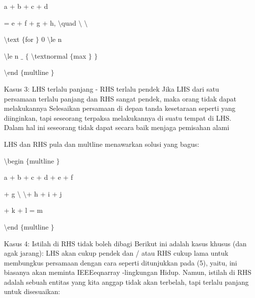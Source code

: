 \noindent 
a + b + c + d \par
\vspace{12pt}
\noindent 
= e + f + g + h,  $  \setminus  $quad  $  \setminus  $ $  \setminus  $ \par
\vspace{12pt}
\noindent 
 $  \setminus  $text $  \{  $for  $  \}  $ 0  $  \setminus  $le n \par
\vspace{12pt}
\noindent 
 $  \setminus  $le n $  \_  $ $  \{  $ $  \setminus  $textnormal $  \{  $max $  \}  $ $  \}  $ \par
\vspace{12pt}
\noindent 
 $  \setminus  $end $  \{  $multline $  \}  $ \par
\vspace{12pt}
\vspace{16pt}
\noindent 
Kasus 3: LHS terlalu panjang - RHS terlalu pendek Jika LHS dari satu persamaan terlalu panjang dan RHS sangat pendek, maka orang tidak dapat melakukannya Selesaikan persamaan di depan tanda kesetaraan seperti yang diinginkan, tapi seseorang terpaksa melakukannya di suatu tempat di LHS. Dalam hal ini seseorang tidak dapat secara baik menjaga pemisahan alami \par
\noindent 
LHS dan RHS pula dan multline menawarkan solusi yang bagus: \par
\vspace{12pt}
\vspace{12pt}
\noindent 
 $  \setminus  $begin $  \{  $multline $  \}  $ \par
\vspace{12pt}
\noindent 
a + b + c + d + e + f \par
\vspace{12pt}
\noindent 
+ g  $  \setminus  $ $  \setminus  $+ h + i + j \par
\vspace{12pt}
\noindent 
+ k + l = m \par
\vspace{12pt}
\noindent 
 $  \setminus  $end $  \{  $multline $  \}  $ \par
\vspace{12pt}
\noindent 
Kasus 4: Istilah di RHS tidak boleh dibagi Berikut ini adalah kasus khusus (dan agak jarang): LHS akan cukup pendek dan / atau RHS cukup lama untuk membungkus persamaan dengan cara seperti ditunjukkan pada (5), yaitu, ini biasanya akan meminta IEEEeqnarray -lingkungan Hidup. Namun, istilah di RHS adalah sebuah entitas yang kita anggap tidak akan terbelah, tapi terlalu panjang untuk disesuaikan: \par
